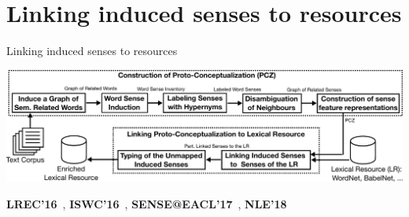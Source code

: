 \section{Linking induced senses to resources}

\begin{frame}{ Linking induced senses to resources }
	
\includegraphics[width=1.05\textwidth]{linking-outline}
\vspace{2em}

\textbf{LREC'16}~\cite{panchenko2016best}, \textbf{ISWC'16}~\cite{faralli2016linked}, \textbf{SENSE@EACL'17}~\cite{panchenko-EtAl:2017:SENSE2017}, \textbf{NLE'18}~\cite{biemann2018framework}

\end{frame}

